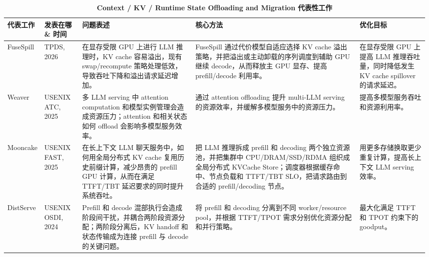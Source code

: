 \begin{table}[!htbp]
    \centering
    \caption{\textbf{Context / KV / Runtime State Offloading and Migration 代表性工作}}
    \label{tab:runtime-state-offloading}
    \renewcommand{\arraystretch}{1.45}
    \scriptsize
    \setlength{\tabcolsep}{4pt}
    \begin{tabularx}{\textwidth}{@{}>{\hsize=0.75\hsize\raggedright\arraybackslash}X >{\hsize=0.75\hsize\raggedright\arraybackslash}X >{\hsize=1.15\hsize\raggedright\arraybackslash}X >{\hsize=1.15\hsize\raggedright\arraybackslash}X >{\hsize=1.20\hsize\raggedright\arraybackslash}X@{}}
        \toprule
        \textbf{代表工作} & \textbf{发表在哪 \& 时间} & \textbf{问题表述} & \textbf{核心方法} & \textbf{优化目标} \\
        \midrule
        FuseSpill \cite{jiang2025efficient} & TPDS, 2026 & 在显存受限 GPU 上进行 LLM 推理时，KV cache 容易溢出，现有 swap/recompute 策略处理低效，导致吞吐下降和溢出请求延迟增加。 & FuseSpill 通过代价模型自适应选择 KV cache 溢出策略，并把溢出或主动卸载的序列调度到辅助 GPU 继续 decode，从而释放主 GPU 显存、提高 prefill/decode 利用率。 & 在显存受限 GPU 上提高 LLM 推理吞吐量，同时降低发生 KV cache spillover 的请求延迟。 \\
        \tabrowrule
        Weaver \cite{gao2025weaver} & USENIX ATC, 2025 & 多 LLM serving 中 attention computation 和模型实例管理会造成资源压力；attention 和相关状态如何 offload 会影响多模型服务效率。 & 通过 attention offloading 提升 multi-LLM serving 的资源效率，并缓解多模型服务中的资源压力。 & 提高多模型服务吞吐和资源利用率。 \\
        \tabrowrule
        Mooncake \cite{qin2025mooncake} & USENIX FAST, 2025 & 在长上下文 LLM 聊天服务中，如何用全局分布式 KV cache 复用历史前缀计算，减少昂贵的 prefill GPU 计算，从而在满足 TTFT/TBT 延迟要求的同时提升系统吞吐。 & 把 LLM 推理拆成 prefill 和 decoding 两个独立资源池，并把集群中 CPU/DRAM/SSD/RDMA 组织成全局分布式 KVCache Store；调度器根据缓存命中、节点负载和 TTFT/TBT SLO，把请求路由到合适的 prefill/decoding 节点。 & 用更多存储换取更少重复计算，提高长上下文 LLM serving 效率。 \\
        \tabrowrule
        DistServe \cite{zhong2024distserve} & USENIX OSDI, 2024 & Prefill 和 decode 混部执行会造成阶段间干扰，并耦合两阶段资源分配；两阶段分离后，KV handoff 和状态传输成为连接 prefill 与 decode 的关键问题。 & 将 prefill 和 decoding 分离到不同 worker/resource pool，并根据 TTFT/TPOT 需求分别优化资源分配和并行策略。 & 最大化满足 TTFT 和 TPOT 约束下的 goodput。 \\

\end{tabularx}
\end{table}
